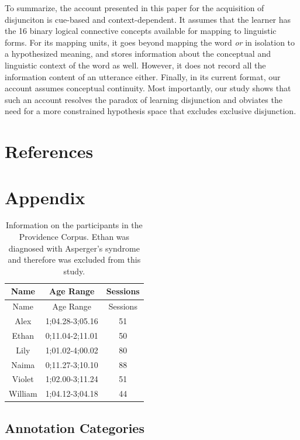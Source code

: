 \documentclass[,man,floatsintext]{apa6}
\begin{document}
To summarize, the account presented in this paper for the acquisition of disjunciton is cue-based and context-dependent. It assumes that the learner has the 16 binary logical connective concepts available for mapping to linguistic forms. For its mapping units, it goes beyond mapping the word \emph{or} in isolation to a hypothesized meaning, and stores information about the conceptual and linguistic context of the word as well. However, it does not record all the information content of an utterance either. Finally, in its current format, our account assumes conceptual continuity. Most importantly, our study shows that such an account resolves the paradox of learning disjunction and obviates the need for a more constrained hypothesis space that excludes exclusive disjunction.

\newpage

\hypertarget{references}{%
\section{References}\label{references}}

\hypertarget{appendix}{%
\section{Appendix}\label{appendix}}

\begin{longtable}[]{@{}ccc@{}}
\caption{\label{tab:providence} Information on the participants in the Providence Corpus. Ethan was diagnosed with Asperger's syndrome and therefore was excluded from this study.}\tabularnewline
\toprule
Name & Age Range & Sessions\tabularnewline
\midrule
\endfirsthead
\toprule
Name & Age Range & Sessions\tabularnewline
\midrule
\endhead
Alex & 1;04.28-3;05.16 & 51\tabularnewline
Ethan & 0;11.04-2;11.01 & 50\tabularnewline
Lily & 1;01.02-4;00.02 & 80\tabularnewline
Naima & 0;11.27-3;10.10 & 88\tabularnewline
Violet & 1;02.00-3;11.24 & 51\tabularnewline
William & 1;04.12-3;04.18 & 44\tabularnewline
\bottomrule
\end{longtable}

\hypertarget{annotation-categories-1}{%
\subsection{Annotation Categories}\label{annotation-categories-1}}
\end{document}
